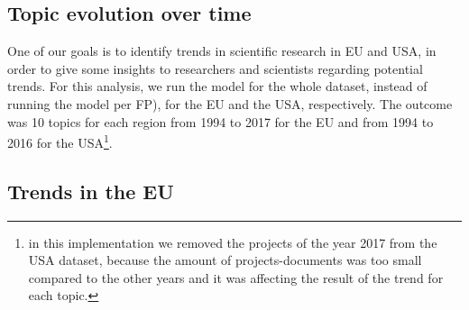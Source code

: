 \documentclass[12pt]{report}
\begin{document}
\vfill
\subsection{Topic evolution over time}

One of our goals is to identify trends in scientific research in EU
and USA, in order to give some insights to researchers and scientists
regarding potential trends. For this analysis, we run the model for
the whole dataset, instead of running the model per FP), for the EU
and the USA, respectively. The outcome was 10 topics for each region
from 1994 to 2017 for the EU and from 1994 to 2016 for the
USA\footnote{in this implementation we removed the projects of the
  year 2017 from the USA dataset, because the amount of
  projects-documents was too small compared to the other years and it
  was affecting the result of the trend for each topic.}.

\subsection{Trends in the EU}
\end{document}
